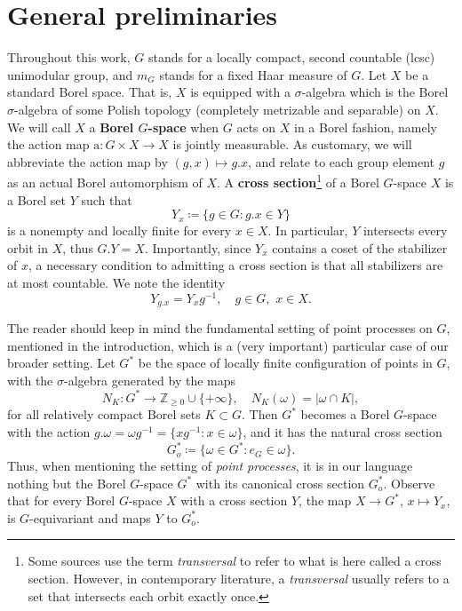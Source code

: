 \documentclass{amsart}
\numberwithin{equation}{subsection}
\theoremstyle{remark}
\begin{document}
\section{General preliminaries}

Throughout this work, \(G\) stands for a locally compact, second countable (lcsc) unimodular group, and \(m_{G}\) stands for a fixed Haar measure of \(G\). Let \(X\) be a standard Borel space. That is, \(X\) is equipped with a \(\sigma\)-algebra which is the Borel \(\sigma\)-algebra of some Polish topology (completely metrizable and separable) on \(X\). We will call \(X\) a {\bf Borel \(G\)-space} when \(G\) acts on \(X\) in a Borel fashion, namely the action map \(\mathrm{a}:G\times X\to X\) is jointly measurable. As customary, we will abbreviate the action map by \(\left(g,x\right)\mapsto g.x\), and relate to each group element \(g\) as an actual Borel automorphism of \(X\). A {\bf cross section}\footnote{Some sources use the term \emph{transversal} to refer to what is here called a cross section. However, in contemporary literature, a \emph{transversal} usually refers to a set that intersects each orbit exactly once.} of a Borel \(G\)-space \(X\) is a Borel set \(Y\) such that
\[Y_{x}\coloneqq \{g\in G: g.x\in Y\}\]
is a nonempty and locally finite for every \(x\in X\). In particular, \(Y\) intersects every orbit in \(X\), thus \(G.Y=X\). Importantly, since \(Y_{x}\) contains a coset of the stabilizer of \(x\), a necessary condition to admitting a cross section is that all stabilizers are at most countable. We note the identity
\[Y_{g.x}=Y_{x}g^{-1},\quad g\in G,\,\,x\in X.\]

The reader should keep in mind the fundamental setting of point processes on \(G\), mentioned in the introduction, which is a (very important) particular case of our broader setting. Let \(G^{\ast}\) be the space of locally finite configuration of points in \(G\), with the \(\sigma\)-algebra generated by the maps
\[N_{K}:G^{\ast}\to\mathbb{Z}_{\geq 0}\cup\{+\infty\},\quad N_{K}\left(\omega\right)=\left|\omega\cap K\right|,\]
for all relatively compact Borel sets \(K\subset G\). Then \(G^{\ast}\) becomes a Borel \(G\)-space with the action \(g.\omega=\omega g^{-1}=\{xg^{-1}: x\in\omega\}\), and it has the natural cross section
\[G_{o}^{\ast}\coloneqq \{\omega\in G^{\ast}: e_{G}\in\omega\}.\]
Thus, when mentioning the setting of \emph{point processes}, it is in our language nothing but the Borel \(G\)-space \(G^{\ast}\) with its canonical cross section \(G_{o}^{\ast}\). Observe that for every Borel \(G\)-space \(X\) with a cross section \(Y\), the map \(X\to G^{\ast}\), \(x\mapsto Y_{x}\), is \(G\)-equivariant and maps \(Y\) to \(G_{o}^{\ast}\).
\end{document}
